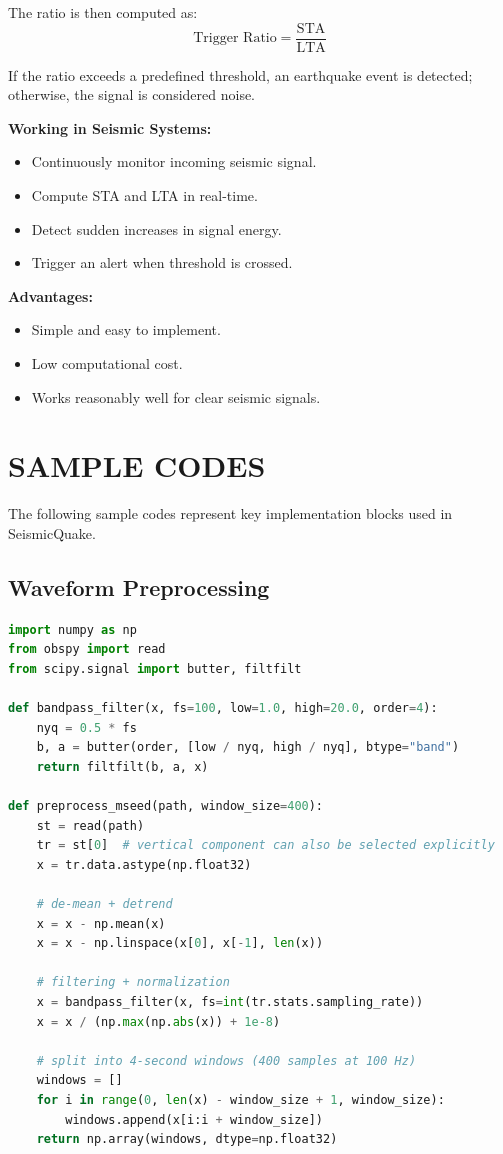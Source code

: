 \documentclass[a4paper,12pt]{report}
\begin{document}
The ratio is then computed as:
\[
\text{Trigger Ratio}=\frac{\text{STA}}{\text{LTA}}
\]

If the ratio exceeds a predefined threshold, an earthquake event is detected; otherwise, the signal is considered noise.

\textbf{Working in Seismic Systems:}
\begin{itemize}
\item Continuously monitor incoming seismic signal.
\item Compute STA and LTA in real-time.
\item Detect sudden increases in signal energy.
\item Trigger an alert when threshold is crossed.
\end{itemize}

\textbf{Advantages:}
\begin{itemize}
\item Simple and easy to implement.
\item Low computational cost.
\item Works reasonably well for clear seismic signals.
\end{itemize}

\section{SAMPLE CODES}
\label{sec:sample_codes}

The following sample codes represent key implementation blocks used in SeismicQuake.

\subsection{Waveform Preprocessing}

\begin{lstlisting}[language=Python, caption={Signal loading and preprocessing}, basicstyle=\ttfamily\small, breaklines=true]
import numpy as np
from obspy import read
from scipy.signal import butter, filtfilt

def bandpass_filter(x, fs=100, low=1.0, high=20.0, order=4):
    nyq = 0.5 * fs
    b, a = butter(order, [low / nyq, high / nyq], btype="band")
    return filtfilt(b, a, x)

def preprocess_mseed(path, window_size=400):
    st = read(path)
    tr = st[0]  # vertical component can also be selected explicitly
    x = tr.data.astype(np.float32)

    # de-mean + detrend
    x = x - np.mean(x)
    x = x - np.linspace(x[0], x[-1], len(x))

    # filtering + normalization
    x = bandpass_filter(x, fs=int(tr.stats.sampling_rate))
    x = x / (np.max(np.abs(x)) + 1e-8)

    # split into 4-second windows (400 samples at 100 Hz)
    windows = []
    for i in range(0, len(x) - window_size + 1, window_size):
        windows.append(x[i:i + window_size])
    return np.array(windows, dtype=np.float32)
\end{lstlisting}
\end{document}
